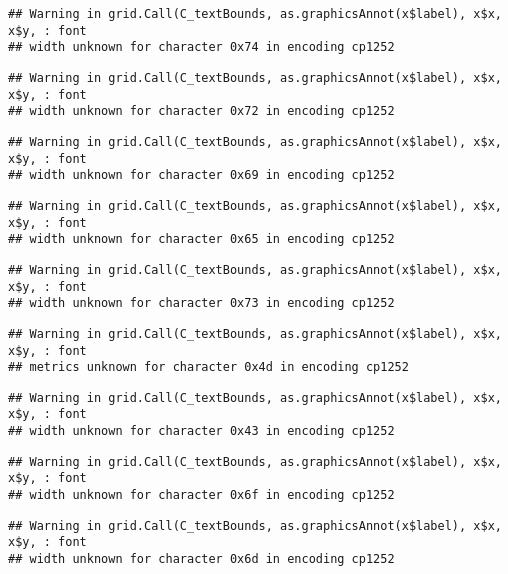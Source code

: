 \documentclass[
]{article}
\begin{document}
\begin{verbatim}
## Warning in grid.Call(C_textBounds, as.graphicsAnnot(x$label), x$x, x$y, : font
## width unknown for character 0x74 in encoding cp1252
\end{verbatim}

\begin{verbatim}
## Warning in grid.Call(C_textBounds, as.graphicsAnnot(x$label), x$x, x$y, : font
## width unknown for character 0x72 in encoding cp1252
\end{verbatim}

\begin{verbatim}
## Warning in grid.Call(C_textBounds, as.graphicsAnnot(x$label), x$x, x$y, : font
## width unknown for character 0x69 in encoding cp1252
\end{verbatim}

\begin{verbatim}
## Warning in grid.Call(C_textBounds, as.graphicsAnnot(x$label), x$x, x$y, : font
## width unknown for character 0x65 in encoding cp1252
\end{verbatim}

\begin{verbatim}
## Warning in grid.Call(C_textBounds, as.graphicsAnnot(x$label), x$x, x$y, : font
## width unknown for character 0x73 in encoding cp1252
\end{verbatim}

\begin{verbatim}
## Warning in grid.Call(C_textBounds, as.graphicsAnnot(x$label), x$x, x$y, : font
## metrics unknown for character 0x4d in encoding cp1252
\end{verbatim}

\begin{verbatim}
## Warning in grid.Call(C_textBounds, as.graphicsAnnot(x$label), x$x, x$y, : font
## width unknown for character 0x43 in encoding cp1252
\end{verbatim}

\begin{verbatim}
## Warning in grid.Call(C_textBounds, as.graphicsAnnot(x$label), x$x, x$y, : font
## width unknown for character 0x6f in encoding cp1252
\end{verbatim}

\begin{verbatim}
## Warning in grid.Call(C_textBounds, as.graphicsAnnot(x$label), x$x, x$y, : font
## width unknown for character 0x6d in encoding cp1252
\end{verbatim}
\end{document}
